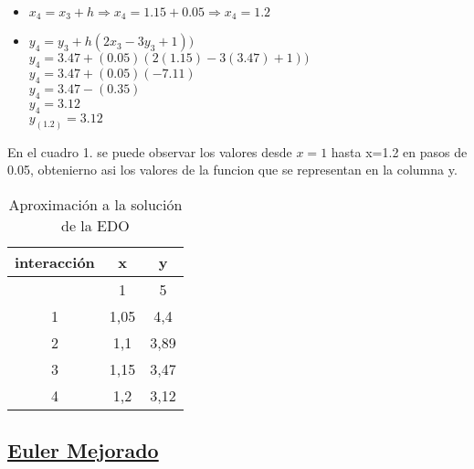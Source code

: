\documentclass[12 pt,letterpaper]{article}
\begin{document}
	\vspace{0.5mm} %
	\begin{itemize}
		\item\textbf{$x_{4}=x_{3}+h  \Rightarrow x_{4}=1.15+0.05\Rightarrow x_{4}=1.2 $} \\
		\item\textbf{$y_{4}=y_{3}+h(2x_{3}-3y_{3}+1))$}\\
		{$y_{4}=3.47+(0.05)(2(1.15)-3(3.47)+1))$}\\
		{$y_{4}=3.47+(0.05)(-7.11)$}\\
		{$y_{4}=3.47-(0.35)$}\\
		{$y_{4}=3.12$}\\
		\textbf{$y_{(1.2)}=3.12$}\\
	\end{itemize}
	En el cuadro 1. se puede observar los valores desde {$x=1$} hasta {x=1.2 }en pasos de 0.05, obtenierno asi los valores de la funcion que se representan en la columna  y.\\
	\begin{table}[H]
		\centering
		\begin{tabular}{|c|c|c|}
			\hline
			interacción & x & y\\
			\hline
			& 1 & 5\\
			\hline
			1 & 1,05 & 4,4\\
			\hline
			2& 1,1 & 3,89\\
			\hline
			3& 1,15 & 3,47\\
			\hline
			4& 1,2 & 3,12\\
			\hline
		\end{tabular}
		\caption{Aproximación a la solución de la EDO \\}
		
	\end{table}
	
	
	
	\flushleft\subsection{\underline{Euler Mejorado}}\vspace{0.5cm}
	
\end{document}
